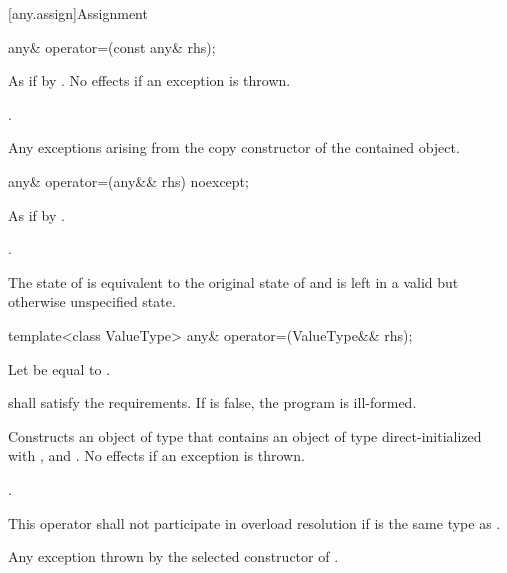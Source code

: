 [any.assign]{Assignment}

\begin{itemdecl}
any& operator=(const any& rhs);
\end{itemdecl}

\begin{itemdescr}
\pnum
\effects
As if by .
No effects if an exception is thrown.

\pnum
\returns
{}.

\pnum
\throws
Any exceptions arising from the copy constructor of the contained object.
\end{itemdescr}

\begin{itemdecl}
any& operator=(any&& rhs) noexcept;
\end{itemdecl}

\begin{itemdescr}
\pnum
\effects
As if by .

\pnum
\returns
{}.

\pnum
\postconditions
The state of  is equivalent to the original state of 
and  is left in a valid but otherwise unspecified state.
\end{itemdescr}

\begin{itemdecl}
template<class ValueType>
any& operator=(ValueType&& rhs);
\end{itemdecl}

\begin{itemdescr}
\pnum
Let  be equal to .

\pnum
\requires
{} shall satisfy the  requirements.
If  is false, the program is ill-formed.

\pnum
\effects
Constructs an object  of type  that contains an object of type  direct-initialized with , and .
No effects if an exception is thrown.

\pnum
\returns
{}.

\pnum
\remarks
This operator shall not participate in overload resolution if  is the same type as .

\pnum
\throws
Any exception thrown by the selected constructor of .
\end{itemdescr}

